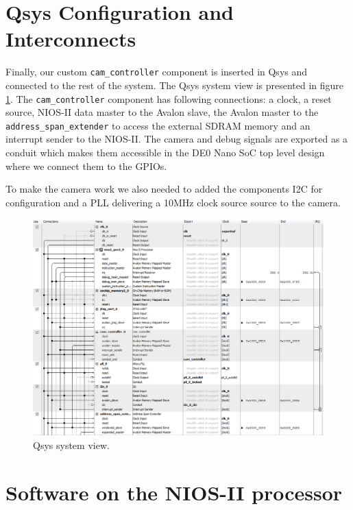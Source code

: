 \documentclass{article}
\begin{document}

\section{Qsys Configuration and Interconnects}

Finally, our custom \verb'cam_controller' component is inserted in Qsys and connected to the rest of the system.
The Qsys system view is presented in figure \ref{fig:qsys}.
The \verb'cam_controller' component has following connections: a clock, a reset source, NIOS-II data master to the Avalon slave, the Avalon master to the \verb'address_span_extender' to access the external SDRAM memory and an interrupt sender to the NIOS-II.
The camera and debug signals are exported as a conduit which makes them accessible in the DE0 Nano SoC top level design where we connect them to the GPIOs.

To make the camera work we also needed to added the components I2C for configuration and a PLL delivering a 10MHz clock source source to the camera.

\begin{figure}[H]
\centering
\includegraphics[width=\textwidth]{images/Qsys.png}
\caption{Qsys system view.}
\label{fig:qsys}
\end{figure}

\section{Software on the NIOS-II processor}
\end{document}
